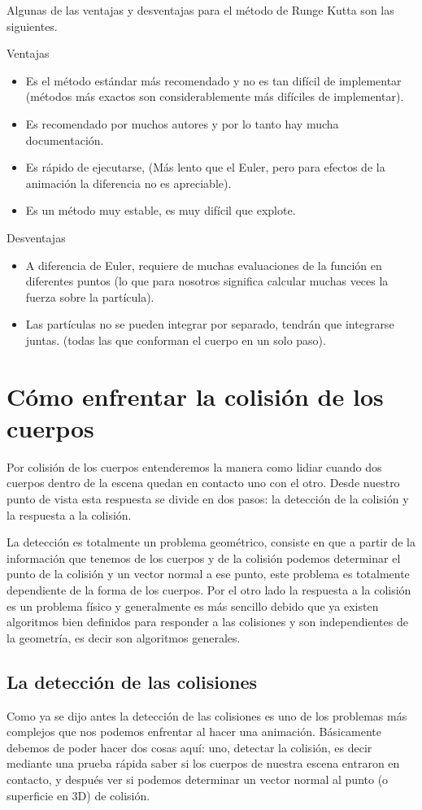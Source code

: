 Algunas de las ventajas y desventajas para el método de Runge Kutta son las siguientes.

Ventajas
\begin{itemize}
\item Es el método estándar más recomendado y no es tan difícil de implementar (métodos más exactos son considerablemente más difíciles de implementar).
\item Es recomendado por muchos autores y por lo tanto hay mucha documentación.
\item Es rápido de ejecutarse, (Más lento que el Euler, pero para efectos de la animación la diferencia no es apreciable).
\item Es un método muy estable, es muy difícil que explote.
\end{itemize}

Desventajas
\begin{itemize}
\item A diferencia de Euler, requiere de muchas evaluaciones de la función en diferentes puntos (lo que para nosotros significa calcular muchas veces la fuerza sobre la partícula).
\item Las partículas no se pueden integrar por separado, tendrán que integrarse juntas. (todas las que conforman el cuerpo en un solo paso).
\end{itemize}

\section{Cómo enfrentar la colisión de los cuerpos}
Por colisión de los cuerpos entenderemos la manera como lidiar cuando dos cuerpos dentro de la escena quedan en contacto uno con el otro.
Desde nuestro punto de vista esta respuesta se divide en dos pasos: la detección de la colisión y la respuesta a la colisión.

La detección es totalmente un problema geométrico, consiste en que a partir de la información que tenemos de los cuerpos y de la colisión podemos determinar el punto de la colisión y un vector normal a ese punto, este problema es totalmente dependiente de la forma de los cuerpos.
Por el otro lado la respuesta a la colisión es un problema físico y generalmente es más sencillo debido que ya existen algoritmos bien definidos para responder a las colisiones y son independientes de la geometría, es decir son algoritmos generales.

\subsection{La detección de las colisiones}
Como ya se dijo antes la detección de las colisiones es uno de los problemas más complejos que nos podemos enfrentar al hacer una animación.
Básicamente debemos de poder hacer dos cosas aquí: uno, detectar la colisión, es decir mediante una prueba rápida saber si los cuerpos de nuestra escena entraron en contacto, y después ver si podemos determinar un vector normal al punto (o superficie en 3D) de colisión.

